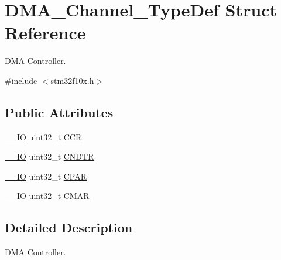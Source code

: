 \hypertarget{struct_d_m_a___channel___type_def}{\section{D\-M\-A\-\_\-\-Channel\-\_\-\-Type\-Def Struct Reference}
\label{struct_d_m_a___channel___type_def}
}


D\-M\-A Controller.  




{\ttfamily \#include $<$stm32f10x.\-h$>$}

\subsection*{Public Attributes}
\begin{DoxyCompactItemize}
\item 
\hyperlink{group___c_m_s_i_s__core__definitions_gaec43007d9998a0a0e01faede4133d6be}{\-\_\-\-\_\-\-I\-O} uint32\-\_\-t \hyperlink{struct_d_m_a___channel___type_def_aa4938d438293f76ff6d9a262715c23eb}{C\-C\-R}
\item 
\hyperlink{group___c_m_s_i_s__core__definitions_gaec43007d9998a0a0e01faede4133d6be}{\-\_\-\-\_\-\-I\-O} uint32\-\_\-t \hyperlink{struct_d_m_a___channel___type_def_af1c675e412fb96e38b6b4630b88c5676}{C\-N\-D\-T\-R}
\item 
\hyperlink{group___c_m_s_i_s__core__definitions_gaec43007d9998a0a0e01faede4133d6be}{\-\_\-\-\_\-\-I\-O} uint32\-\_\-t \hyperlink{struct_d_m_a___channel___type_def_a8ce1c9c2742eaaa0e97ddbb3a06154cc}{C\-P\-A\-R}
\item 
\hyperlink{group___c_m_s_i_s__core__definitions_gaec43007d9998a0a0e01faede4133d6be}{\-\_\-\-\_\-\-I\-O} uint32\-\_\-t \hyperlink{struct_d_m_a___channel___type_def_a7a9886b5f9e0edaf5ced3d1870b33ad7}{C\-M\-A\-R}
\end{DoxyCompactItemize}


\subsection{Detailed Description}
D\-M\-A Controller. 

